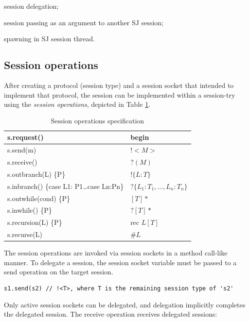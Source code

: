 \begin{compactenum}
\item  session delegation;

\item  session passing as an argument to another SJ session;

\item  spawning in SJ session thread.
\end{compactenum}

\subsection{Session operations}

After creating a protocol (session type) and a session socket that intended to implement that protocol, the session can be implemented within a session-try using the \textit{session operations}, depicted in Table \ref{tab:session-ops}.

\begin{longtable}{|p{}|p{}|}
\caption{Session operations specification}\label{tab:session-ops}\\ \hline
s.request() & begin \\ \hline 
s.send(m) & $!<M>$ \\ \hline
s.receive() & $?(M)$ \\ \hline
s.outbranch(L) \{P\} & $!\{L:T\}$ \\ \hline
s.inbranch() \{case L1: {P1}\dots case Ln:{Pn}\} & $?\{L_1:T_1,\dots, L_n:T_n\}$ \\ \hline
s.outwhile(cond) \{P\} & $[T]*$ \\ \hline
s.inwhile() \{P\} & $?[T]*$ \\ \hline
s.recursion(L) \{P\} & rec $L[T]$ \\ \hline
s.recurse(L) & $\#L$ \\ \hline
\end{longtable}

The session operations are invoked via session sockets in a method call-like manner. To delegate a session, the session socket variable must be passed to a send operation on the target session.

\begin{lstlisting}
s1.send(s2) // !<T>, where T is the remaining session type of 's2'
\end{lstlisting}

Only active session sockets can be delegated, and delegation implicitly completes the delegated session. The receive operation receives delegated sessions:

